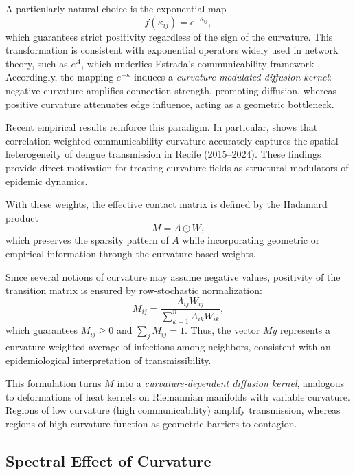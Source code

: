 \documentclass[final,3p,times,twocolumn]{elsarticle}
\begin{document}
A particularly natural choice is the exponential map
\[
    f(\kappa_{ij}) = e^{-\kappa_{ij}},
\]
which guarantees strict positivity regardless of the sign of the curvature.  
This transformation is consistent with exponential operators widely used in network theory, such as $e^A$, which underlies Estrada's communicability framework \cite{Estrada2012}.  
Accordingly, the mapping $e^{-\kappa}$ induces a \emph{curvature-modulated diffusion kernel}: negative curvature amplifies connection strength, promoting diffusion, whereas positive curvature attenuates edge influence, acting as a geometric bottleneck.

Recent empirical results reinforce this paradigm.  
In particular, \cite{santos2025correlationweightedcommunicabilitycurvaturestructural} shows that correlation-weighted communicability curvature accurately captures the spatial heterogeneity of dengue transmission in Recife (2015--2024).  
These findings provide direct motivation for treating curvature fields as structural modulators of epidemic dynamics.

With these weights, the effective contact matrix is defined by the Hadamard product
\[
    M = A \odot W,
\]
which preserves the sparsity pattern of $A$ while incorporating geometric or empirical information through the curvature-based weights.

Since several notions of curvature may assume negative values, positivity of the transition matrix is ensured by row-stochastic normalization:
\[
    M_{ij}
    =
    \frac{A_{ij} W_{ij}}{\sum_{k=1}^n A_{ik} W_{ik}},
\]
which guarantees $M_{ij}\ge 0$ and $\sum_j M_{ij}=1$.  
Thus, the vector $My$ represents a curvature-weighted average of infections among neighbors, consistent with an epidemiological interpretation of transmissibility.

This formulation turns $M$ into a \emph{curvature-dependent diffusion kernel}, analogous to deformations of heat kernels on Riemannian manifolds with variable curvature.  
Regions of low curvature (high communicability) amplify transmission, whereas regions of high curvature function as geometric barriers to contagion.


\subsection{Spectral Effect of Curvature}
\end{document}

